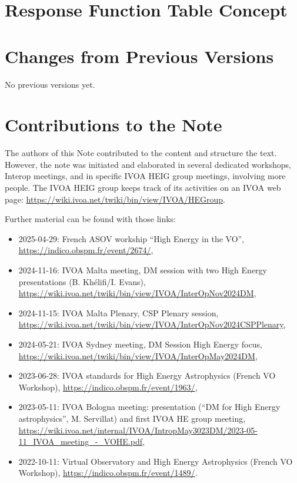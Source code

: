 \documentclass[11pt,a4paper]{ivoa}
\begin{document}
\pagebreak
\section{Response Function Table Concept}\label{sec:accessoptionsappendix}




\pagebreak
\section{Changes from Previous Versions}

No previous versions yet.

\pagebreak
\section{Contributions to the Note}

The authors of this Note contributed to the content and structure the text. However, the note was initiated and elaborated in several dedicated workshops, Interop meetings, and in specific \gls{IVOA} \gls{HEIG} group meetings, involving more people. The \gls{IVOA} \gls{HEIG} group keeps track of its activities on an \gls{IVOA} web page: \url{https://wiki.ivoa.net/twiki/bin/view/IVOA/HEGroup}.

Further material can be found with those links:
\begin{itemize}
    \item 2025-04-29: French ASOV workship ``High Energy in the VO'', \url{https://indico.obspm.fr/event/2674/},
    \item 2024-11-16: IVOA Malta meeting, DM session with two High Energy presentations (B. Kh\'elifi/I. Evans), \url{https://wiki.ivoa.net/twiki/bin/view/IVOA/InterOpNov2024DM},
    \item 2024-11-15: IVOA Malta Plenary, CSP Plenary session, \url{https://wiki.ivoa.net/twiki/bin/view/IVOA/InterOpNov2024CSPPlenary},
    \item 2024-05-21: IVOA Sydney meeting, DM Session High Energy focus, \url{https://wiki.ivoa.net/twiki/bin/view/IVOA/InterOpMay2024DM},
    \item 2023-06-28: IVOA standards for High Energy Astrophysics (French VO Workshop), \url{https://indico.obspm.fr/event/1963/},
    \item 2023-05-11: IVOA Bologna meeting: presentation (``DM for High Energy astrophysics'', M. Servillat) and first IVOA HE group meeting, \url{https://wiki.ivoa.net/internal/IVOA/IntropMay3023DM/2023-05-11_IVOA_meeting_-_VOHE.pdf},
    \item 2022-10-11: Virtual Observatory and High Energy Astrophysics (French VO Workshop), \url{https://indico.obspm.fr/event/1489/}.
\end{itemize}

\end{document}
